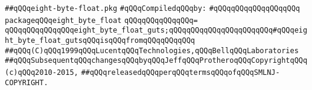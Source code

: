 \label{src/lib/std/eight-byte-float.pkg}
\verb|##qQQqeight-byte-float.pkg|\newline
\newline
\verb|#qQQqCompiledqQQqby:|\newline
\verb|#qQQqqQQqqQQqqQQqqQQq|\newline
\newline
\verb|packageqQQqeight_byte_float|\newline
\verb|qQQqqQQqqQQqqQQq=|\newline
\verb|qQQqqQQqqQQqqQQqeight_byte_float_guts;qQQqqQQqqQQqqQQqqQQqqQQq#qQQqeight_byte_float_gutsqQQqisqQQqfromqQQqqQQqqQQq|\newline
\newline
\newline
\verb|##qQQq(C)qQQq1999qQQqLucentqQQqTechnologies,qQQqBellqQQqLaboratories|\newline
\verb|##qQQqSubsequentqQQqchangesqQQqbyqQQqJeffqQQqProtheroqQQqCopyrightqQQq(c)qQQq2010-2015,|\newline
\verb|##qQQqreleasedqQQqperqQQqtermsqQQqofqQQqSMLNJ-COPYRIGHT.|\newline
\newline

